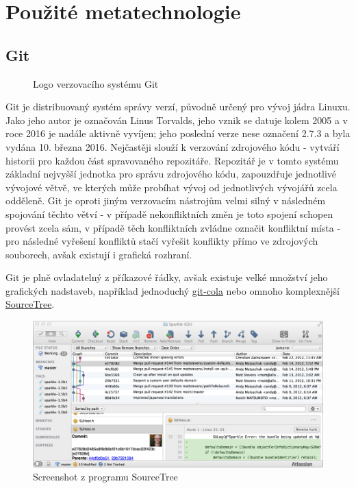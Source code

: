 \section{Použité metatechnologie}

\subsection{Git}
\label{subsec:git}

\begin{figure}
 \centering
 
 \caption{Logo verzovacího systému Git}
\end{figure}

Git je distribuovaný systém správy verzí, původně určený pro vývoj jádra Linuxu. Jako jeho autor je označován Linus Torvalds, jeho vznik se datuje kolem 2005 a v roce 2016 je nadále aktivně vyvíjen; jeho poslední verze nese označení 2.7.3 a byla vydána 10. března 2016. Nejčastěji slouží k verzování zdrojového kódu - vytváří historii pro každou část spravovaného repozitáře. Repozitář je v tomto systému základní nejvyšší jednotka pro správu zdrojového kódu, zapouzdřuje jednotlivé vývojové větvě, ve kterých může probíhat vývoj od jednotlivých vývojářů zcela odděleně. Git je oproti jiným verzovacím nástrojům velmi silný v následném spojování těchto větví - v případě nekonfliktních změn je toto spojení schopen provést zcela sám, v případě těch konfliktních zvládne označit konfliktní místa - pro následné vyřešení konfliktů stačí vyřešit konflikty přímo ve zdrojových souborech, avšak existují i grafická rozhraní.

Git je plně ovladatelný z příkazové řádky, avšak existuje velké množství jeho grafických nadstaveb, například jednoduchý \href{http://git-cola.github.io/}{git-cola} nebo omnoho komplexnější \href{https://www.sourcetreeapp.com/}{SourceTree}.

\begin{figure}[bht]
 \centering
 \includegraphics[width=\textwidth]{assets/source-tree-screenshot}
 \caption{Screenshot z programu SourceTree}
\end{figure}

